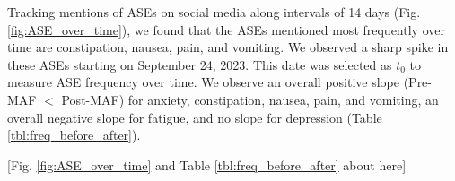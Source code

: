 \documentclass[referee,bst/sn-basic]{sn-jnl}%
\theoremstyle{thmstyletwo}%
\theoremstyle{thmstylethree}%
\begin{document}
Tracking mentions of ASEs on social media along intervals of 14 days (Fig. \ref{fig:ASE_over_time}), we found that the ASEs mentioned most frequently over time are constipation, nausea, pain, and vomiting. 
We observed a sharp spike in these ASEs starting on September 24, 2023.
This date was selected as $t_0$ to measure ASE frequency over time.
We observe an overall positive slope (Pre-MAF $<$ Post-MAF) for anxiety, constipation, nausea, pain, and vomiting, an overall negative slope for fatigue, and no slope for depression (Table \ref{tbl:freq_before_after}).

\begin{center}
    [Fig. \ref{fig:ASE_over_time} and Table \ref{tbl:freq_before_after} about here]
\end{center}

\begin{comment}
\begin{figure}
    \centering
    \texttt{[image: images/ASE\_over\_time.pdf]}
    \caption{ASEs mentions $> 10$ in each of the 14-day intervals on $\mathbb{X}$ and Reddit. 
    }
    \label{fig:ASE_over_time}
\end{figure} 
\end{comment}

\end{document}

